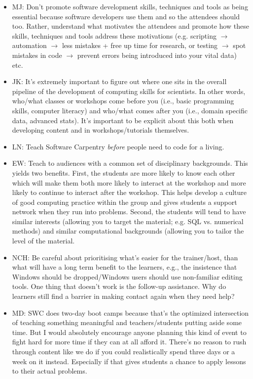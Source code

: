 \documentclass{article}
\begin{document}
\begin{itemize}
  \item MJ: Don't promote software development skills, techniques and
    tools as being essential because software developers use them and
    so the attendees should too. Rather, understand what motivates the
    attendees and promote how these skills, techniques and tools
    address these motivations (e.g. scripting $\rightarrow$ automation
    $\rightarrow$ less mistakes + free up time for research, or
    testing $\rightarrow$ spot mistakes in code $\rightarrow$ prevent
    errors being introduced into your vital data) etc.

  \item JK: It's extremely important to figure out where one sits in
    the overall pipeline of the development of computing skills for
    scientists. In other words, who/what classes or workshops come
    before you (i.e., basic programming skills, computer literacy) and
    who/what comes after you (i.e., domain specific data, advanced
    stats). It's important to be explicit about this both when
    developing content and in workshops/tutorials themselves.

  \item LN: Teach Software Carpentry \emph{before} people need to code
    for a living.

  \item EW: Teach to audiences with a common set of disciplinary
    backgrounds. This yields two benefits. First, the students are
    more likely to know each other which will make them both more
    likely to interact at the workshop and more likely to continue to
    interact after the workshop. This helps develop a culture of good
    computing practice within the group and gives students a support
    network when they run into problems. Second, the students will
    tend to have similar interests (allowing you to target the
    material; e.g. SQL vs. numerical methods) and similar
    computational backgrounds (allowing you to tailor the level of the
    material.

  \item NCH: Be careful about prioritising what's easier for the
    trainer/host, than what will have a long term benefit to the
    learners, e.g., the insistence that Windows should be
    dropped/Windows users should use non-familiar editing tools.  One
    thing that doesn't work is the follow-up assistance. Why do
    learners still find a barrier in making contact again when they
    need help?

  \item MD: SWC does two-day boot camps because that's the optimized
    intersection of teaching something meaningful and
    teachers/students putting aside some time. But I would absolutely
    encourage anyone planning this kind of event to fight hard for
    more time if they can at all afford it. There's no reason to rush
    through content like we do if you could realistically spend three
    days or a week on it instead. Especially if that gives students a
    chance to apply lessons to their actual problems.


\end{itemize}
\end{document}
